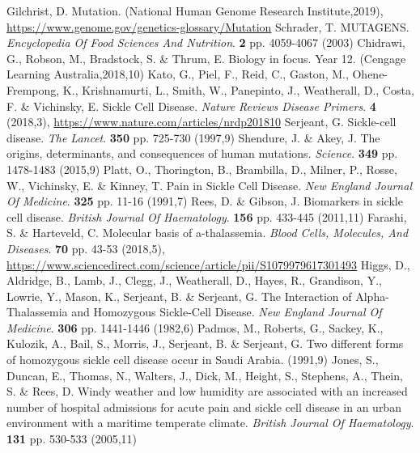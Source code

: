 \documentclass{mva_style}
\begin{document}
\begin{thebibliography}{99}

Gilchrist, D. Mutation. (National Human Genome Research Institute,2019), \url{https://www.genome.gov/genetics-glossary/Mutation}
Schrader, T. MUTAGENS. {\em Encyclopedia Of Food Sciences And Nutrition}. \textbf{2} pp. 4059-4067 (2003)
Chidrawi, G., Robson, M., Bradstock, S. \& Thrum, E. Biology in focus. Year 12. (Cengage Learning Australia,2018,10)
Kato, G., Piel, F., Reid, C., Gaston, M., Ohene-Frempong, K., Krishnamurti, L., Smith, W., Panepinto, J., Weatherall, D., Costa, F. \& Vichinsky, E. Sickle Cell Disease. {\em Nature Reviews Disease Primers}. \textbf{4} (2018,3), \url{https://www.nature.com/articles/nrdp201810}
Serjeant, G. Sickle-cell disease. {\em The Lancet}. \textbf{350} pp. 725-730 (1997,9)
Shendure, J. \& Akey, J. The origins, determinants, and consequences of human mutations. {\em Science}. \textbf{349} pp. 1478-1483 (2015,9)
Platt, O., Thorington, B., Brambilla, D., Milner, P., Rosse, W., Vichinsky, E. \& Kinney, T. Pain in Sickle Cell Disease. {\em New England Journal Of Medicine}. \textbf{325} pp. 11-16 (1991,7)
Rees, D. \& Gibson, J. Biomarkers in sickle cell disease. {\em British Journal Of Haematology}. \textbf{156} pp. 433-445 (2011,11)
Farashi, S. \& Harteveld, C. Molecular basis of a-thalassemia. {\em Blood Cells, Molecules, And Diseases}. \textbf{70} pp. 43-53 (2018,5), \url{https://www.sciencedirect.com/science/article/pii/S1079979617301493}
Higgs, D., Aldridge, B., Lamb, J., Clegg, J., Weatherall, D., Hayes, R., Grandison, Y., Lowrie, Y., Mason, K., Serjeant, B. \& Serjeant, G. The Interaction of Alpha-Thalassemia and Homozygous Sickle-Cell Disease. {\em New England Journal Of Medicine}. \textbf{306} pp. 1441-1446 (1982,6)
Padmos, M., Roberts, G., Sackey, K., Kulozik, A., Bail, S., Morris, J., Serjeant, B. \& Serjeant, G. Two different forms of homozygous sickle cell disease occur in Saudi Arabia.  (1991,9)
Jones, S., Duncan, E., Thomas, N., Walters, J., Dick, M., Height, S., Stephens, A., Thein, S. \& Rees, D. Windy weather and low humidity are associated with an increased number of hospital admissions for acute pain and sickle cell disease in an urban environment with a maritime temperate climate. {\em British Journal Of Haematology}. \textbf{131} pp. 530-533 (2005,11)

\end{thebibliography}
\end{document}
